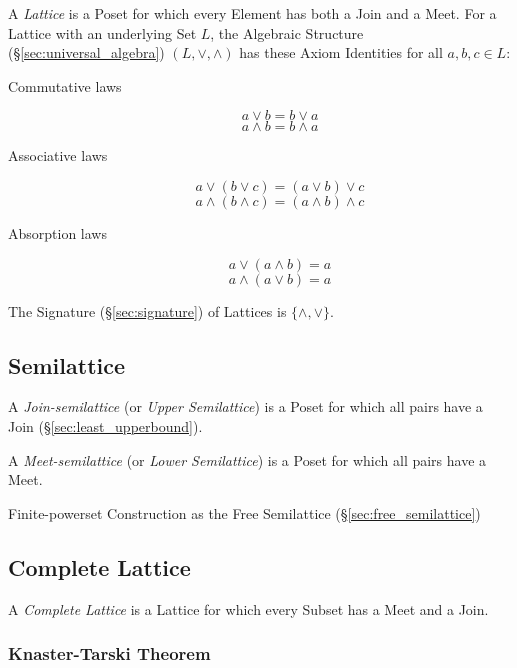 A \emph{Lattice} is a Poset for which every Element has both a Join
and a Meet. For a Lattice with an underlying Set $L$, the Algebraic
Structure (\S\ref{sec:universal_algebra}) $(L, \vee, \wedge)$ has
these Axiom Identities for all $a,b,c \in L$:
\begin{description}
\item[Commutative laws]
\[
    a \vee b = b \vee a
\] \[
    a \wedge b = b \wedge a
\]
\item[Associative laws]
\[
    a \vee (b \vee c) = (a \vee b) \vee c
\] \[
    a \wedge (b \wedge c) = (a \wedge b) \wedge c
\]
\item[Absorption laws]
\[
    a \vee (a \wedge b) = a
\] \[
    a \wedge (a \vee b) = a
\]
\end{description}
The Signature (\S\ref{sec:signature}) of Lattices is
$\{\wedge, \vee\}$.



\subsection{Semilattice}\label{sec:semilattice}

A \emph{Join-semilattice} (or \emph{Upper Semilattice}) is a Poset for
which all pairs have a Join (\S\ref{sec:least_upperbound}).

A \emph{Meet-semilattice} (or \emph{Lower Semilattice}) is a Poset for
which all pairs have a Meet.

Finite-powerset Construction as the Free Semilattice
(\S\ref{sec:free_semilattice})



\subsection{Complete Lattice}\label{sec:complete_lattice}

A \emph{Complete Lattice} is a Lattice for which every Subset has a
Meet and a Join.



\subsubsection{Knaster-Tarski Theorem}\label{sec:knaster_tarski}


